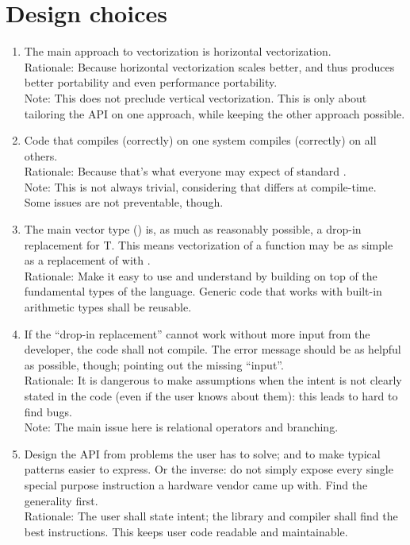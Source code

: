 \section{Design choices}
\begin{enumerate}
  \item\label{design horizontal} The main approach to vectorization is horizontal vectorization.
    \\Rationale: Because horizontal vectorization scales better, and thus produces better portability and even performance portability.
    \\Note: This does not preclude vertical vectorization.
    This is only about tailoring the API on one approach, while keeping the other approach possible.

  \item\label{design portable} Code that compiles (correctly) on one system compiles (correctly) on all others.
    \\Rationale: Because that's what everyone may expect of standard \CC{}.
    \\Note: This is not always trivial, considering that \simd{} differs at compile-time.
    Some issues are not preventable, though.

  \item\label{design drop-in} The main vector type (\simd[<T>]) is, as much as reasonably possible, a drop-in replacement for \type T.
    This means vectorization of a function may be as simple as a replacement of \float with \simd[<float>].
    \\Rationale: Make it easy to use and understand by building on top of the fundamental types of the language.
    Generic code that works with built-in arithmetic types shall be reusable.

  \item\label{design safety}  If the “drop-in replacement” cannot work without more input from the developer, the code shall not compile.
    The error message should be as helpful as possible, though; pointing out the missing “input”.
    \\Rationale: It is dangerous to make assumptions when the intent is not clearly stated in the code (even if the user knows about them): this leads to hard to find bugs.
    \\Note: The main issue here is relational operators and branching.

  \item\label{design user-centered} Design the API from problems the user has to solve; and to make typical patterns easier to express.
    Or the inverse: do not simply expose every single special purpose instruction a hardware vendor came up with.
    Find the generality first.
    \\Rationale: The user shall state intent; the library and compiler shall find the best instructions.
    This keeps user code readable and maintainable.
\end{enumerate}

